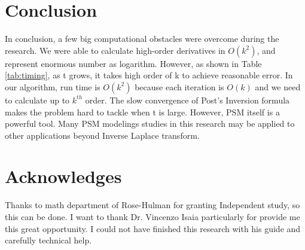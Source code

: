 \documentclass[12pt]{article}
\begin{document}
\section{Conclusion}
In conclusion, a few big computational obstacles were overcome during the research. We were able to calculate high-order derivatives in $O(k^{2})$, and represent enormous number as logarithm. However, as shown in Table \ref{tab:timing}, as t grows, it takes high order of k to achieve reasonable error. In our algorithm, run time is $O(k^{2})$ because each iteration is $O(k)$ and we need to calculate up to $k^{th}$ order. The slow convergence of Post's Inversion formula makes the problem hard to tackle when t is large. However, PSM itself is a powerful tool. Many PSM modelings studies in this research may be applied to other applications beyond Inverse Laplace transform.


\section{Acknowledges}
Thanks to math department of Rose-Hulman for granting Independent study, so this can be done. I want to thank Dr. Vincenzo Isaia particularly for provide me this great opportunity. I could not have finished this research with his guide and carefully technical help.

\clearpage

\end{document}
